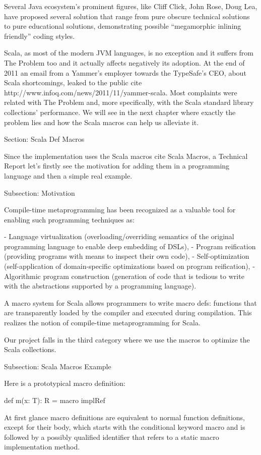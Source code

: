 Several Java ecosystem's prominent figures, like Cliff Click, John Rose, Doug
Lea, have proposed several solution that range from pure obscure technical
solutions to pure educational solutions, demonstrating possible ``megamorphic
inlining friendly'' coding styles.

Scala, as most of the modern JVM languages, is no exception and it suffers from
The Problem too and it actually affects negatively its adoption. At the end of
2011 an email from a Yammer's employer towards the TypeSafe's CEO, about Scala
shortcomings, leaked to the public {cite
http://www.infoq.com/news/2011/11/yammer-scala}. Most complaints were related
with The Problem and, more specifically, with the Scala standard
library collections' performance. We will see in the next chapter where exactly
the problem lies and how the Scala macros can help us alleviate it.


Section: Scala Def Macros

Since the implementation uses the Scala macros {cite Scala Macros, a Technical
Report} let's firstly see the motivation for adding them in a programming
language and then a simple real example.


Subsection: Motivation

Compile-time metaprogramming has been recognized as a valuable tool for enabling
such programming techniques as:

- Language virtualization (overloading/overriding semantics of the original
programming language to enable deep embedding of DSLs),
- Program reification (providing programs with means to inspect their own code),
- Self-optimization (self-application of domain-specific optimizations based on
program reification),
- Algorithmic program construction (generation of code that is tedious to write
with the abstractions supported by a programming language).

A macro system for Scala allows programmers to write macro defs: functions that
are transparently loaded by the compiler and executed during compilation. This
realizes the notion of compile-time metaprogramming for Scala.

Our project falls in the third category where we use the macros to optimize the
Scala collections.


Subsection: Scala Macros Example

Here is a prototypical macro definition:

def m(x: T): R = macro implRef

At first glance macro definitions are equivalent to normal function definitions,
except for their body, which starts with the conditional keyword macro and is
followed by a possibly qualified identifier that refers to a static macro
implementation method.

